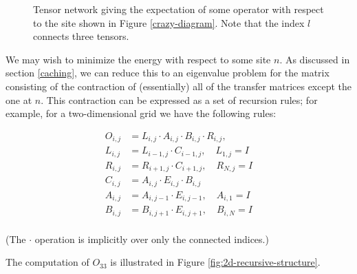 \documentclass[12pt]{amsbook}
\theoremstyle{plain}
\theoremstyle{definition}
\theoremstyle{remark}
\begin{document}
\begin{figure}
\centering
{}
\caption{\label{crazy-transfer-matrix-network} Tensor network giving the expectation of some operator with respect to the site shown in Figure \ref{crazy-diagram}.  Note that the index $l$ connects three tensors.}
\end{figure}

We may wish to minimize the energy with respect to some site $n$.  As discussed in section \ref{caching}, we can reduce this to an eigenvalue problem for the matrix consisting of the contraction of (essentially) all of the transfer matrices except the one at $n$.  This contraction can be expressed as a set of recursion rules;  for example, for a two-dimensional grid we have the following rules:

$$
\begin{aligned}
O_{i,j} &= L_{i,j} \cdot A_{i,j} \cdot B_{i,j} \cdot R_{i,j}, \\
L_{i,j} &= L_{i-1,j}\cdot C_{i-1,j}, \quad L_{1,j} = I \\
R_{i,j} &= R_{i+1,j}\cdot C_{i+1,j}, \quad R_{N,j} = I \\
C_{i,j} &= A_{i,j}\cdot E_{i,j} \cdot B_{i,j} \\
A_{i,j} &= A_{i,j-1}\cdot E_{i,j-1}, \quad A_{i,1} = I \\
B_{i,j} &= B_{i,j+1}\cdot E_{i,j+1}, \quad B_{i,N} = I \\
\end{aligned}
$$

\noindent (The $\cdot$ operation is implicitly over only the connected indices.)

The computation of $O_{33}$ is illustrated in Figure \ref{fig:2d-recursive-structure}.
\end{document}
